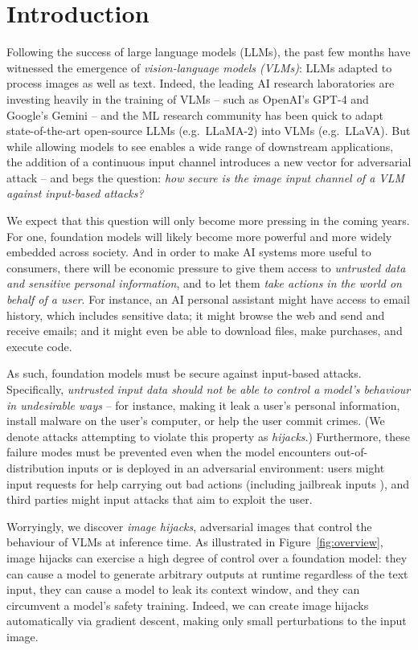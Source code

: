 \documentclass{article} %
\begin{document}
\section{Introduction}

Following the success of large language models (LLMs), the past few months have witnessed the emergence of \emph{vision-language models (VLMs)}: LLMs adapted to process images as well as text. Indeed, the leading AI research laboratories are investing heavily in the training of VLMs -- such as OpenAI's GPT-4 \citep{gpt4} and Google's Gemini \citep{gemini} -- and the ML research community has been quick to adapt state-of-the-art open-source LLMs (e.g.~LLaMA-2) into VLMs (e.g.~LLaVA). But while allowing models to see enables a wide range of downstream applications, the addition of a continuous input channel introduces a new vector for adversarial attack -- and begs the question: \emph{how secure is the image input channel of a VLM against input-based attacks?}

We expect that this question will only become more pressing in the coming years. For one, foundation models will likely become more powerful and more widely embedded across society. And in order to make AI systems more useful to consumers, there will be economic pressure to give them access to \emph{untrusted data and sensitive personal information}, and to let them \emph{take actions in the world on behalf of a user}. For instance, an AI personal assistant might have access to email history, which includes sensitive data; it might browse the web and send and receive emails; and it might even be able to download files, make purchases, and execute code.

As such, foundation models must be secure against input-based attacks. Specifically, \emph{untrusted input data should not be able to control a model's behaviour in undesirable ways}  -- for instance, making it leak a user’s personal information, install malware on the user’s computer, or help the user commit crimes. (We denote attacks attempting to violate this property as \emph{hijacks}.) Furthermore, these failure modes must be prevented even when the model encounters out-of-distribution inputs or is deployed in an adversarial environment: users might input requests for help carrying out bad actions (including jailbreak inputs \citep{wei2023jailbroken,zou2023universal}), and third parties might input attacks that aim to exploit the user.


Worryingly, we discover \emph{image hijacks}, adversarial images that control the behaviour of VLMs at inference time. As illustrated in Figure~\ref{fig:overview}, image hijacks can exercise a high degree of control over a foundation model: they can cause a model to generate arbitrary outputs at runtime regardless of the text input, they can cause a model to leak its context window, and they can circumvent a model's safety training. Indeed, we can create image hijacks automatically via gradient descent, making only small perturbations to the input image.%
\end{document}

